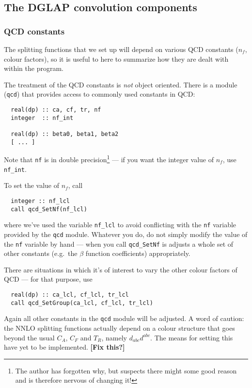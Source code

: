 \documentclass[12pt]{article}
\newcommand{\comment}[1]{\textbf{[#1]}}
\newcommand{\eg}{e.g.\ }
\newcommand{\ttt}[1]{\texttt{#1}}
\begin{document}
\subsection{The DGLAP convolution components}
\label{sec:dglap_holder}

\subsubsection{QCD constants}
\label{sec:qcd}

The splitting functions that we set up will depend on various QCD
constants ($n_f$, colour factors), so it is useful to here to
summarize how they are dealt with within the program.

The treatment of the QCD constants is \emph{not} object oriented.
There is a module (\ttt{qcd}) that provides access to commonly used
constants in QCD:
\begin{verbatim}
  real(dp) :: ca, cf, tr, nf
  integer  :: nf_int
  
  real(dp) :: beta0, beta1, beta2
  [ ... ]
\end{verbatim}
Note that \ttt{nf} is in double precision\footnote{The author has
  forgotten why, but suspects there might some good reason and is
  therefore nervous of changing it!} --- if you want the integer value
of $n_f$, use \ttt{nf\_int}. 

To set the value of $n_f$, call
\begin{verbatim}
  integer :: nf_lcl
  call qcd_SetNf(nf_lcl)  
\end{verbatim}
where we've used the variable \ttt{nf\_lcl} to avoid conflicting with
the \ttt{nf} variable provided by the \ttt{qcd} module. Whatever you
do, do not simply modify the value of the \ttt{nf} variable by hand
--- when you call \ttt{qcd\_SetNf} is adjusts a whole set of other
constants (\eg the $\beta$ function coefficients) appropriately.

There are situations in which it's of interest to vary the other
colour factors of QCD --- for that purpose, use
\begin{verbatim}
  real(dp) :: ca_lcl, cf_lcl, tr_lcl
  call qcd_SetGroup(ca_lcl, cf_lcl, tr_lcl)
\end{verbatim}
Again all other constants in the \ttt{qcd} module will be adjusted. A
word of caution: the NNLO splitting functions actually depend on a
colour structure that goes beyond the usual $C_A$, $C_F$ and $T_R$,
namely $d_{abc}d^{abc}$. The means for setting this have yet to be
implemented. \comment{Fix this?}
\end{document}
